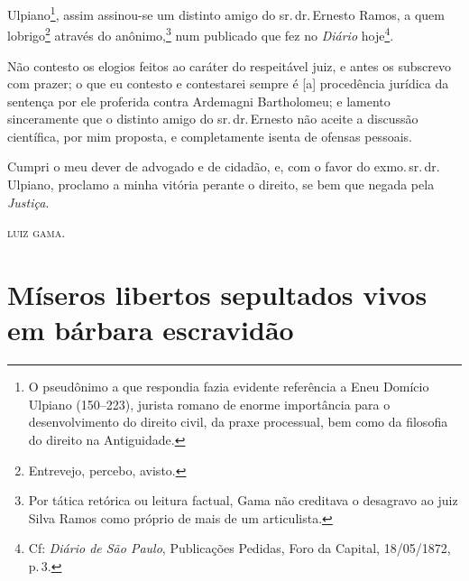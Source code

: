 Ulpiano\footnote{ O pseudônimo a que respondia fazia evidente
  referência a Eneu Domício Ulpiano (150--223), jurista romano de enorme
  importância para o desenvolvimento do direito civil, da praxe
  processual, bem como da filosofia do direito na Antiguidade.}, assim
assinou-se um distinto amigo do sr.\,dr.\,Ernesto Ramos, a quem
lobrigo\footnote{ Entrevejo, percebo, avisto.} através do
anônimo,\footnote{ Por tática retórica ou leitura factual, Gama não
  creditava o desagravo ao juiz Silva Ramos como próprio de mais de um
  articulista.} num publicado que fez no \emph{Diário} hoje\footnote{
  Cf: \emph{Diário de São Paulo}, Publicações Pedidas, Foro da Capital,
  18/05/1872, p.\,3.}.

Não contesto os elogios feitos ao caráter do respeitável juiz, e antes
os subscrevo com prazer; o que eu contesto e contestarei sempre é
{[}a{]} procedência jurídica da sentença por ele proferida contra
Ardemagni Bartholomeu; e lamento sinceramente que o distinto amigo do
sr.\,dr.\,Ernesto não aceite a discussão científica, por mim proposta, e
completamente isenta de ofensas pessoais.

Cumpri o meu dever de advogado e de cidadão, e, com o favor do exmo.\,sr.\,dr.\,Ulpiano, proclamo a minha vitória perante o direito, se bem que
negada pela \emph{Justiça}.

\textsc{luiz gama}.

\part{Míseros libertos sepultados vivos em bárbara escravidão}

